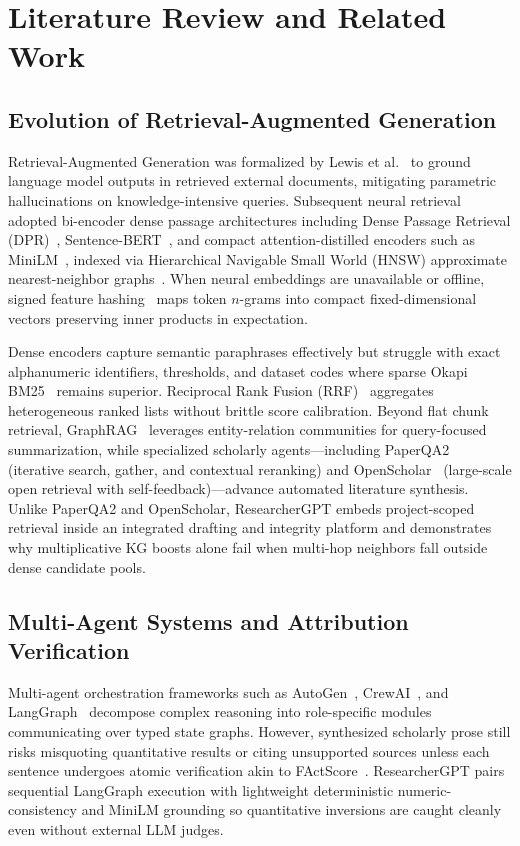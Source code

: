 \documentclass[conference]{IEEEtran}
\begin{document}
\section{Literature Review and Related Work}

\subsection{Evolution of Retrieval-Augmented Generation}
Retrieval-Augmented Generation was formalized by Lewis et al.~\cite{lewis2020rag} to ground language model outputs in retrieved external documents, mitigating parametric hallucinations on knowledge-intensive queries. Subsequent neural retrieval adopted bi-encoder dense passage architectures including Dense Passage Retrieval (DPR)~\cite{karpukhin2020dpr}, Sentence-BERT~\cite{reimers2019sbert}, and compact attention-distilled encoders such as MiniLM~\cite{wang2020minilm}, indexed via Hierarchical Navigable Small World (HNSW) approximate nearest-neighbor graphs~\cite{malkov2020hnsw}. When neural embeddings are unavailable or offline, signed feature hashing~\cite{weinberger2009hashing} maps token $n$-grams into compact fixed-dimensional vectors preserving inner products in expectation.

Dense encoders capture semantic paraphrases effectively but struggle with exact alphanumeric identifiers, thresholds, and dataset codes where sparse Okapi BM25~\cite{robertson2009bm25} remains superior. Reciprocal Rank Fusion (RRF)~\cite{cormack2009rrf} aggregates heterogeneous ranked lists without brittle score calibration. Beyond flat chunk retrieval, GraphRAG~\cite{edge2024graphrag} leverages entity-relation communities for query-focused summarization, while specialized scholarly agents---including PaperQA2~\cite{skarlinski2024paperqa2} (iterative search, gather, and contextual reranking) and OpenScholar~\cite{asai2024openscholar} (large-scale open retrieval with self-feedback)---advance automated literature synthesis. Unlike PaperQA2 and OpenScholar, ResearcherGPT embeds project-scoped retrieval inside an integrated drafting and integrity platform and demonstrates why multiplicative KG boosts alone fail when multi-hop neighbors fall outside dense candidate pools.

\subsection{Multi-Agent Systems and Attribution Verification}
Multi-agent orchestration frameworks such as AutoGen~\cite{wu2023autogen}, CrewAI~\cite{moura2024crewai}, and LangGraph~\cite{langchain2024langgraph,pearson2026langgraph} decompose complex reasoning into role-specific modules communicating over typed state graphs. However, synthesized scholarly prose still risks misquoting quantitative results or citing unsupported sources unless each sentence undergoes atomic verification akin to FActScore~\cite{min2023factscore}. ResearcherGPT pairs sequential LangGraph execution with lightweight deterministic numeric-consistency and MiniLM grounding so quantitative inversions are caught cleanly even without external LLM judges.
\end{document}
